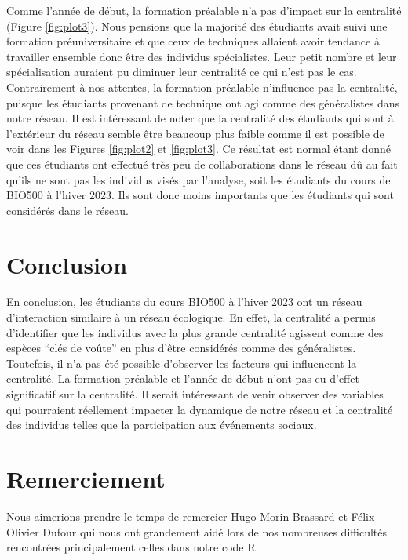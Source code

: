\documentclass[preprint, 3p,
authoryear]{elsarticle} %
\begin{document}
Comme l'année de début, la formation préalable n'a pas d'impact sur la
centralité (Figure \ref{fig:plot3}). Nous pensions que la majorité des
étudiants avait suivi une formation préuniversitaire et que ceux de
techniques allaient avoir tendance à travailler ensemble donc être des
individus spécialistes. Leur petit nombre et leur spécialisation
auraient pu diminuer leur centralité ce qui n'est pas le cas.
Contrairement à nos attentes, la formation préalable n'influence pas la
centralité, puisque les étudiants provenant de technique ont agi comme
des généralistes dans notre réseau. Il est intéressant de noter que la
centralité des étudiants qui sont à l'extérieur du réseau semble être
beaucoup plus faible comme il est possible de voir dans les Figures
\ref{fig:plot2} et \ref{fig:plot3}. Ce résultat est normal étant donné
que ces étudiants ont effectué très peu de collaborations dans le réseau
dû au fait qu'ils ne sont pas les individus visés par l'analyse, soit
les étudiants du cours de BIO500 à l'hiver 2023. Ils sont donc moins
importants que les étudiants qui sont considérés dans le réseau.

\hypertarget{conclusion}{%
\section{Conclusion}\label{conclusion}}

En conclusion, les étudiants du cours BIO500 à l'hiver 2023 ont un
réseau d'interaction similaire à un réseau écologique. En effet, la
centralité a permis d'identifier que les individus avec la plus grande
centralité agissent comme des espèces ``clés de voûte'' en plus d'être
considérés comme des généralistes. Toutefois, il n'a pas été possible
d'observer les facteurs qui influencent la centralité. La formation
préalable et l'année de début n'ont pas eu d'effet significatif sur la
centralité. Il serait intéressant de venir observer des variables qui
pourraient réellement impacter la dynamique de notre réseau et la
centralité des individus telles que la participation aux événements
sociaux.

\hypertarget{remerciement}{%
\section{Remerciement}\label{remerciement}}

Nous aimerions prendre le temps de remercier Hugo Morin Brassard et
Félix-Olivier Dufour qui nous ont grandement aidé lors de nos nombreuses
difficultés rencontrées principalement celles dans notre code R.

\renewcommand\refname{References}

\end{document}
